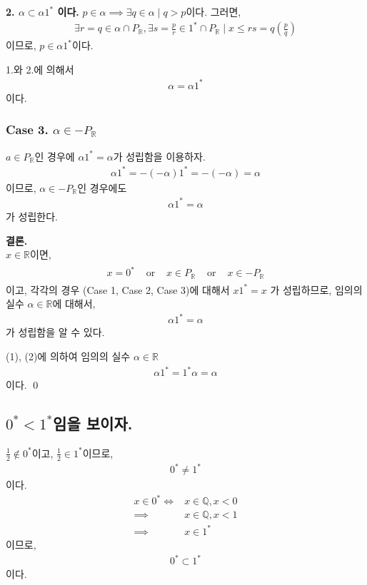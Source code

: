 \documentclass{article}
\begin{document}
\textbf{2. $\alpha \subset \alpha 1^*$ 이다.}
$p \in \alpha \implies \exists q \in \alpha \mid q > p$이다. 그러면,
\begin{align*}
\exists r=q \in \alpha \cap P_{\mathbb{R}}, \exists s=\frac{p}{r} \in 1^* \cap P_{\mathbb{R}} \mid x \le rs = q \left(\frac{p}{q} \right)
\end{align*}이므로, $p \in \alpha 1^*$이다.

1.와 2.에 의해서 
\begin{align*}
\alpha = \alpha 1^*
\end{align*}이다.

\subsubsection{Case 3. $\alpha \in -P_{\mathbb{R}}$}
$a \in P_{\mathbb{R}}$인 경우에 $\alpha 1^* = \alpha$가 성립함을 이용하자.
\begin{align*}
\alpha 1^* = -(-\alpha) 1^* = -(-\alpha) = \alpha
\end{align*}이므로, $\alpha \in -P_{\mathbb{R}}$인 경우에도
\begin{align*}
\alpha 1^* = \alpha
\end{align*}가 성립한다.


\textbf{결론.} 
\\$x \in \mathbb{R}$이면,
\begin{align*}
\begin{matrix}
x = 0^* & \text{ or } & x \in P_{\mathbb{R}} & \text{ or } & x \in -P_{\mathbb{R}}
\end{matrix}
\end{align*}이고, 각각의 경우 (Case 1, Case 2, Case 3)에 대해서 $x 1^* = x$ 가 성립하므로, 
임의의 실수 $\alpha \in\mathbb{R}$에 대해서,
\begin{align*}
\alpha 1^* = \alpha \tag{2}
\end{align*}가 성립함을 알 수 있다.

(1), (2)에 의하여 임의의 실수 $\alpha \in \mathbb{R}$
\begin{align*}
\alpha 1^* = 1^* \alpha = \alpha
\end{align*}이다. \qed

\subsection{$0^* < 1^*$임을 보이자.}
$\frac{1}{2} \notin 0^*$이고, $\frac{1}{2} \in 1^*$이므로,
\begin{align*}
0^* \neq 1^* \tag{1}
\end{align*}이다.
\begin{align*}
x \in 0^* \iff& x \in \mathbb{Q}, x < 0
\\ \implies& x \in \mathbb{Q}, x < 1
\\ \implies& x \in 1^*
\end{align*}이므로, 
\begin{align*}
0^* \subset 1^* \tag{2}
\end{align*}이다.
\end{document}
